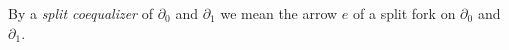 By a \emph{split coequalizer} of $\partial_0$ and $\partial_1$ we mean the arrow $e$ of a split fork on $\partial_0$ and $\partial_1$.
